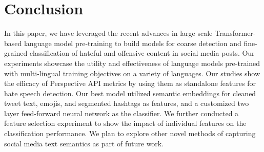 \documentclass[
]{ceurart}
\begin{document}
\section{Conclusion}
In this paper, we have leveraged the recent advances in large scale Transformer-based language model pre-training to build models for coarse detection and fine-grained classification of hateful and offensive content in social media posts. Our experiments showcase the utility and effectiveness of language models pre-trained with multi-lingual training objectives on a variety of languages. Our studies show the efficacy of Perspective API metrics by using them as standalone features for hate speech detection. Our best model utilized semantic embeddings for cleaned tweet text, emojis, and segmented hashtags as features, and a customized two layer feed-forward neural network as the classifier. We further conducted a feature selection experiment to show the impact of individual features on the classification performance. We plan to explore other novel methods of capturing social media text semantics as part of future work.


\end{document}
